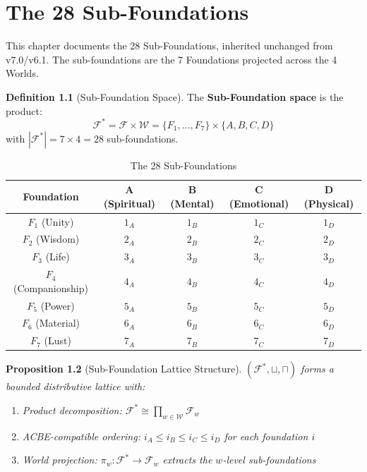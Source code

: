\documentclass[11pt,twoside,openright]{book}
\theoremstyle{definition}
\newtheorem{definition}{Definition}[chapter]
\theoremstyle{plain}
\newtheorem{proposition}[definition]{Proposition}
\theoremstyle{remark}
\newcommand{\Worlds}{\mathcal{W}}
\newcommand{\Foundations}{\mathcal{F}}
\begin{document}
\chapter{The 28 Sub-Foundations}
\label{ch:28-subfoundations}

\begin{tcolorbox}[colback=gray!10!white,colframe=gray!75!black,title=\textbf{Canonical Reference (Inherited)}]
This chapter documents the 28 Sub-Foundations, inherited unchanged from v7.0/v6.1. The sub-foundations are the 7 Foundations projected across the 4 Worlds.
\end{tcolorbox}

\begin{definition}[Sub-Foundation Space]
\label{def:v71-subfoundation-space}
The \textbf{Sub-Foundation space} is the product:
\[
\Foundations^* = \Foundations \times \Worlds = \{F_1, \ldots, F_7\} \times \{A, B, C, D\}
\]
with $|\Foundations^*| = 7 \times 4 = 28$ sub-foundations.
\end{definition}

\begin{table}[ht]
\centering
\caption{The 28 Sub-Foundations}
\label{tab:v71-28-subfoundations}
\begin{tabular}{c|cccc}
\toprule
\textbf{Foundation} & \textbf{A (Spiritual)} & \textbf{B (Mental)} & \textbf{C (Emotional)} & \textbf{D (Physical)} \\
\midrule
$F_1$ (Unity) & $1_A$ & $1_B$ & $1_C$ & $1_D$ \\
$F_2$ (Wisdom) & $2_A$ & $2_B$ & $2_C$ & $2_D$ \\
$F_3$ (Life) & $3_A$ & $3_B$ & $3_C$ & $3_D$ \\
$F_4$ (Companionship) & $4_A$ & $4_B$ & $4_C$ & $4_D$ \\
$F_5$ (Power) & $5_A$ & $5_B$ & $5_C$ & $5_D$ \\
$F_6$ (Material) & $6_A$ & $6_B$ & $6_C$ & $6_D$ \\
$F_7$ (Lust) & $7_A$ & $7_B$ & $7_C$ & $7_D$ \\
\bottomrule
\end{tabular}
\end{table}

\begin{proposition}[Sub-Foundation Lattice Structure]
\label{prop:v71-subfoundation-lattice}
$(\Foundations^*, \sqcup, \sqcap)$ forms a bounded distributive lattice with:
\begin{enumerate}[label=(\roman*)]
  \item Product decomposition: $\Foundations^* \cong \prod_{w \in \Worlds} \Foundations_w$
  \item ACBE-compatible ordering: $i_A \leq i_B \leq i_C \leq i_D$ for each foundation $i$
  \item World projection: $\pi_w : \Foundations^* \to \Foundations_w$ extracts the $w$-level sub-foundations
\end{enumerate}
\end{proposition}
\end{document}
